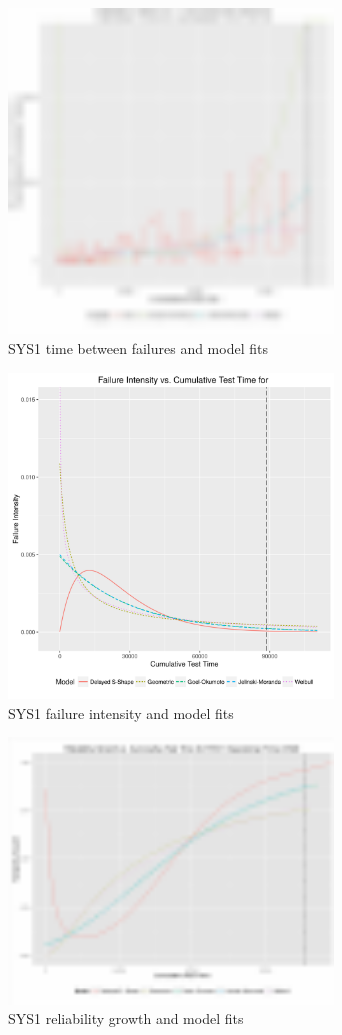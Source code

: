 \documentclass[journal]{IEEEtran}
\begin{document}
\begin{figure}[!h]
\centering
\includegraphics[width=3.4in]{Figures/TBF}
\caption{SYS1 time between failures and model fits}
\label{fig_TBF}
\end{figure}

\begin{figure}[!h]
\centering
\includegraphics[width=3.4in]{Figures/FI}
\caption{SYS1 failure intensity and model fits}
\label{fig_FI}
\end{figure}

\begin{figure}[!h]
\centering
\includegraphics[width=3.4in]{Figures/Reliability_growth}
\caption{SYS1 reliability growth and model fits}
\label{fig_RG}
\end{figure}
\end{document}
